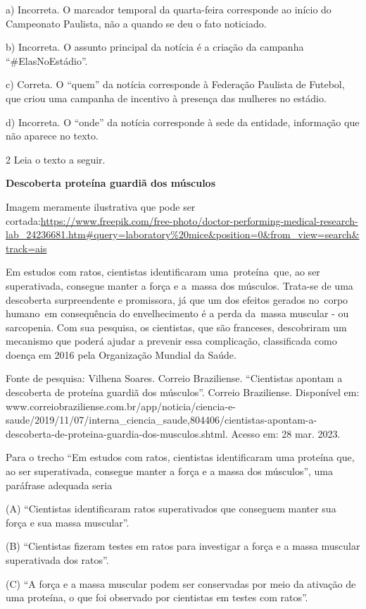 \begin{itemize}
a) Incorreta. O marcador temporal da quarta-feira corresponde ao início
do Campeonato Paulista, não a quando se deu o fato noticiado.

b) Incorreta. O assunto principal da notícia é a criação da campanha
``\#ElasNoEstádio''.

c) Correta. O ``quem'' da notícia corresponde à Federação Paulista de
Futebol, que criou uma campanha de incentivo à presença das mulheres no
estádio.

d) Incorreta. O ``onde'' da notícia corresponde à sede da entidade,
informação que não aparece no texto.

\num{2} Leia o texto a seguir.

\textbf{Descoberta proteína guardiã dos músculos}

Imagem meramente ilustrativa que pode ser
cortada:\url{https://www.freepik.com/free-photo/doctor-performing-medical-research-lab_24236681.htm\#query=laboratory\%20mice\&position=0\&from_view=search\&track=ais}

Em estudos com ratos, cientistas identificaram uma~proteína~que, ao ser
superativada, consegue manter a força e a~massa dos músculos. Trata-se
de uma descoberta surpreendente e promissora, já que um dos efeitos
gerados no~corpo humano~em consequência do envelhecimento é a perda
da~massa muscular - ou sarcopenia. Com sua pesquisa, os cientistas, que
são franceses, descobriram um mecanismo que poderá ajudar a prevenir
essa complicação, classificada como doença em 2016 pela Organização
Mundial da Saúde.

Fonte de pesquisa: Vilhena Soares. Correio Braziliense. ``Cientistas
apontam a descoberta de proteína guardiã dos músculos''. Correio
Braziliense. Disponível em:
www.correiobraziliense.com.br/app/noticia/ciencia-e-saude/2019/11/07/interna\_ciencia\_saude,804406/cientistas-apontam-a-descoberta-de-proteina-guardia-dos-musculos.shtml.
Acesso em: 28 mar. 2023.

Para o trecho ``Em estudos com ratos, cientistas identificaram uma
proteína que, ao ser superativada, consegue manter a força e a massa dos
músculos'', uma paráfrase adequada seria

(A) ``Cientistas identificaram ratos superativados que conseguem manter
sua força e sua massa muscular''.

(B) ``Cientistas fizeram testes em ratos para investigar a força e a
massa muscular superativada dos ratos''.

(C) ``A força e a massa muscular podem ser conservadas por meio da
ativação de uma proteína, o que foi observado por cientistas em testes
com ratos''.


\end{itemize}
